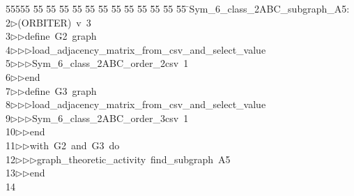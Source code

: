 %
%
\begin{tabbing}
55555 \= 55 \= 55 \= 55 \= 55 \= 55 \= 55 \= 55 \= 55 \= 55 \= 55 \= 55 \= 55 \= \>Sym\_6\_class\_2ABC\_subgraph\_A5:\\[0pt]
2\>$\triangleright$\>(ORBITER)\ v\ 3\ \\[0pt]
3\>$\triangleright$\>$\triangleright$\>define\ G2\ graph\ \\[0pt]
4\>$\triangleright$\>$\triangleright$\>$\triangleright$\>load\_adjacency\_matrix\_from\_csv\_and\_select\_value\ \\[0pt]
5\>$\triangleright$\>$\triangleright$\>$\triangleright$\>Sym\_6\_class\_2ABC\_order\_2csv\ 1\ \\[0pt]
6\>$\triangleright$\>$\triangleright$\>end\ \\[0pt]
7\>$\triangleright$\>$\triangleright$\>define\ G3\ graph\ \\[0pt]
8\>$\triangleright$\>$\triangleright$\>$\triangleright$\>load\_adjacency\_matrix\_from\_csv\_and\_select\_value\ \\[0pt]
9\>$\triangleright$\>$\triangleright$\>$\triangleright$\>Sym\_6\_class\_2ABC\_order\_3csv\ 1\ \\[0pt]
10\>$\triangleright$\>$\triangleright$\>end\ \\[0pt]
11\>$\triangleright$\>$\triangleright$\>with\ G2\ and\ G3\ do\ \\[0pt]
12\>$\triangleright$\>$\triangleright$\>$\triangleright$\>graph\_theoretic\_activity\ find\_subgraph\ A5\ \\[0pt]
13\>$\triangleright$\>$\triangleright$\>end\ \\[0pt]
14\>\end{tabbing}
